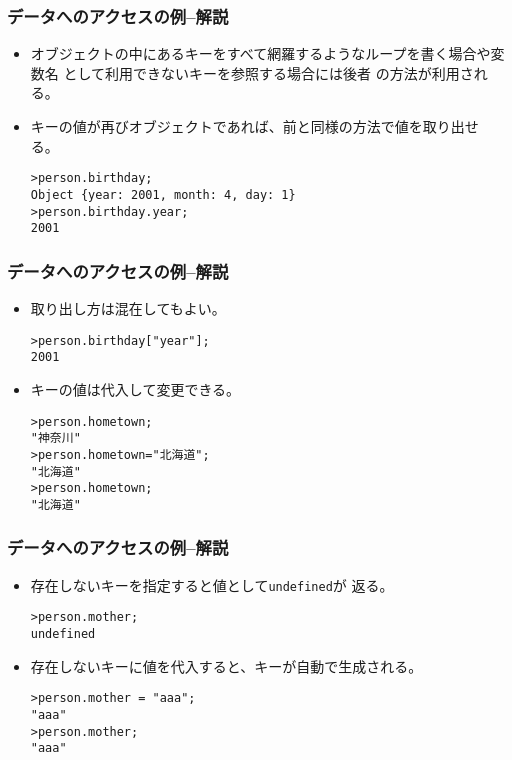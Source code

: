 \begin{frame}[containsverbatim]
\frametitle{データへのアクセスの例--解説}
\begin{itemize}
 \item 
オブジェクトの中にあるキーをすべて網羅するようなループを書く場合や変数名
       として利用できないキーを参照する場合には後者
       の方法が利用される。
 \item キーの値が再びオブジェクトであれば、前と同様の方法で値を取り出せ
       る。
\begin{Verbatim}
>person.birthday;
Object {year: 2001, month: 4, day: 1}
>person.birthday.year;
2001
\end{Verbatim}
\end{itemize}
\end{frame}
\begin{frame}[containsverbatim]
\frametitle{データへのアクセスの例--解説}
\begin{itemize}
 \item 取り出し方は混在してもよい。
\begin{Verbatim}
>person.birthday["year"];
2001
\end{Verbatim}
 \item キーの値は代入して変更できる。
\begin{Verbatim}
>person.hometown;
"神奈川"
>person.hometown="北海道";
"北海道"
>person.hometown;
"北海道"
\end{Verbatim}
\end{itemize}
\end{frame}
\begin{frame}[containsverbatim]
\frametitle{データへのアクセスの例--解説}
\begin{itemize}
 \item 存在しないキーを指定すると値として\Verb+undefined+が
       返る。
\begin{Verbatim}
>person.mother;
undefined
\end{Verbatim}
 \item 存在しないキーに値を代入すると、キーが自動で生成される。
\begin{Verbatim}
>person.mother = "aaa";
"aaa"
>person.mother;
"aaa"
\end{Verbatim}
\end{itemize}
\end{frame}
